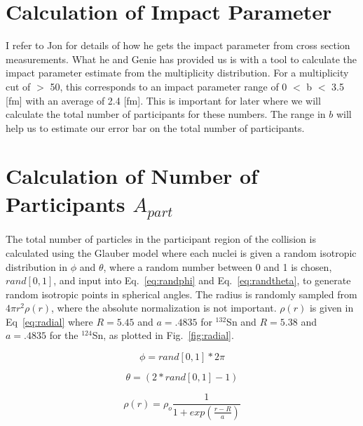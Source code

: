 \documentclass[12pt, letterpaper, twoside]{article}
\begin{document}
 
 
 \clearpage
 
 \section{Calculation of Impact Parameter}
 I refer to Jon for details of how he gets the impact parameter from cross section measurements. What he and Genie has provided us is with a tool to calculate the impact parameter estimate from the multiplicity distribution. For a multiplicity cut of $>$ 50, this corresponds to an impact parameter range of 0 $<$ b $<$ 3.5 [fm] with an average of 2.4 [fm]. This is important for later where we will calculate the total number of participants for these numbers. The range in $b$ will help us to estimate our error bar on the total number of participants. 
 
 \section{Calculation of Number of Participants $A_{part}$}
 The total number of particles in the participant region of the collision is calculated using the Glauber model where each nuclei is given a random isotropic distribution in $\phi$ and $\theta$, where a random number between 0 and 1 is chosen, $rand[0,1]$, and input into Eq.~\ref{eq:randphi} and Eq.~\ref{eq:randtheta}, to generate random isotropic points in spherical angles. The radius is randomly sampled from $4\pi r^{2}\rho(r)$, where the absolute normalization is not important. $\rho(r)$ is given in Eq~\ref{eq:radial} where $R=5.45$ and $a=.4835$ for ${}^{132}$Sn and $R=5.38$ and $a=.4835$ for the ${}^{124}$Sn, as plotted in Fig.~\ref{fig:radial}.
 
 \begin{equation}
 \phi = rand[0,1] * 2\pi
 \label{eq:randphi}
 \end{equation}
 
 \begin{equation}
  \theta = (2*rand[0,1] - 1)
  \label{eq:randtheta}
 \end{equation}
 
 \begin{equation}
 \rho(r) = \rho_{o} \frac{1}{1+ exp(\frac{r-R}{a})}
 \label{eq:radial}
 \end{equation}
 
\end{document}
